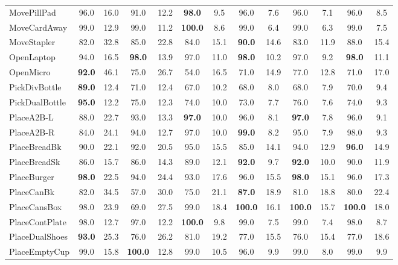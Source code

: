 \documentclass{article}
\begin{document}
\begin{table}[t]
\begin{tabular}{@{}lcccccccccccc@{}}
MovePillPad    & 96.0 & 16.0 & 91.0 & 12.2 & \textbf{98.0} & 9.5 & 96.0 & 7.6 & 96.0 & 7.1 & 96.0 & 8.5 \\
MoveCardAway   & 99.0 & 12.9 & 99.0 & 11.2 & \textbf{100.0} & 8.6 & 99.0 & 6.4 & 99.0 & 6.3 & 99.0 & 7.5 \\
MoveStapler    & 82.0 & 32.8 & 85.0 & 22.8 & 84.0 & 15.1 & \textbf{90.0} & 14.6 & 83.0 & 11.9 & 88.0 & 15.4 \\
OpenLaptop     & 94.0 & 16.5 & \textbf{98.0} & 13.9 & 97.0 & 11.0 & \textbf{98.0} & 10.2 & 97.0 & 9.2 & \textbf{98.0} & 11.1 \\
OpenMicro      & \textbf{92.0} & 46.1 & 75.0 & 26.7 & 54.0 & 16.5 & 71.0 & 14.9 & 77.0 & 12.8 & 71.0 & 17.0 \\
PickDivBottle  & \textbf{89.0} & 12.4 & 71.0 & 12.4 & 67.0 & 10.2 & 68.0 & 8.0 & 68.0 & 7.9 & 70.0 & 9.4 \\
PickDualBottle & \textbf{95.0} & 12.2 & 75.0 & 12.3 & 74.0 & 10.0 & 73.0 & 7.7 & 76.0 & 7.6 & 74.0 & 9.3 \\
PlaceA2B-L     & 88.0 & 22.7 & 93.0 & 13.3 & \textbf{97.0} & 10.0 & 96.0 & 8.1 & \textbf{97.0} & 7.8 & 96.0 & 9.1 \\
PlaceA2B-R     & 84.0 & 24.1 & 94.0 & 12.7 & 97.0 & 10.0 & \textbf{99.0} & 8.2 & 95.0 & 7.9 & 98.0 & 9.3 \\
PlaceBreadBk   & 90.0 & 22.1 & 92.0 & 20.5 & 95.0 & 15.5 & 85.0 & 14.1 & 94.0 & 12.9 & \textbf{96.0} & 14.9 \\
PlaceBreadSk   & 86.0 & 15.7 & 86.0 & 14.3 & 89.0 & 12.1 & \textbf{92.0} & 9.7 & \textbf{92.0} & 10.0 & 90.0 & 11.9 \\
PlaceBurger    & \textbf{98.0} & 22.5 & 94.0 & 24.4 & 93.0 & 17.6 & 96.0 & 15.5 & \textbf{98.0} & 15.1 & 96.0 & 17.3 \\
PlaceCanBk     & 82.0 & 34.5 & 57.0 & 30.0 & 75.0 & 21.1 & \textbf{87.0} & 18.9 & 81.0 & 18.8 & 80.0 & 22.4 \\
PlaceCansBox   & 98.0 & 23.9 & 69.0 & 27.5 & 99.0 & 18.4 & \textbf{100.0} & 16.1 & \textbf{100.0} & 15.7 & \textbf{100.0} & 18.0 \\
PlaceContPlate & 98.0 & 12.7 & 97.0 & 12.2 & \textbf{100.0} & 9.8 & 99.0 & 7.5 & 99.0 & 7.4 & 98.0 & 8.7 \\
PlaceDualShoes & \textbf{93.0} & 25.3 & 76.0 & 26.2 & 81.0 & 19.2 & 77.0 & 15.5 & 76.0 & 15.4 & 77.0 & 18.6 \\
PlaceEmptyCup  & 99.0 & 15.8 & \textbf{100.0} & 12.8 & 99.0 & 10.5 & 96.0 & 9.9 & 99.0 & 8.0 & 99.0 & 9.9 \\

\end{tabular}
\end{table}
\end{document}
